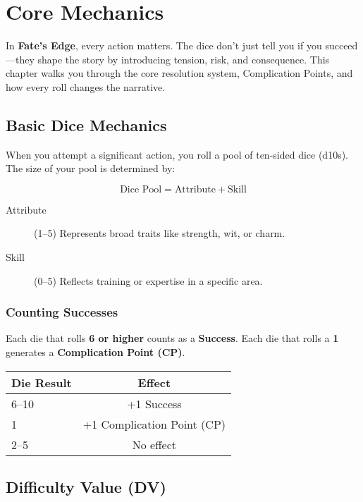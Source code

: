 
\chapter{Core Mechanics}

In \textbf{Fate’s Edge}, every action matters. The dice don’t just tell you if you succeed—they shape the story by introducing tension, risk, and consequence. This chapter walks you through the core resolution system, Complication Points, and how every roll changes the narrative.

\section{Basic Dice Mechanics}

When you attempt a significant action, you roll a pool of ten-sided dice (d10s). The size of your pool is determined by:

\[
\text{Dice Pool} = \text{Attribute} + \text{Skill}
\]

\begin{description}
  \item[Attribute] (1–5) Represents broad traits like strength, wit, or charm.
  \item[Skill] (0–5) Reflects training or expertise in a specific area.
\end{description}

\subsection*{Counting Successes}

Each die that rolls \textbf{6 or higher} counts as a \textbf{Success}. Each die that rolls a \textbf{1} generates a \textbf{Complication Point (CP)}.

\begin{center}
\begin{tabular}{lc}
\toprule
\textbf{Die Result} & \textbf{Effect} \\
\midrule
6–10 & +1 Success \\
1 & +1 Complication Point (CP) \\
2–5 & No effect \\
\bottomrule
\end{tabular}
\end{center}

\section{Difficulty Value (DV)}

